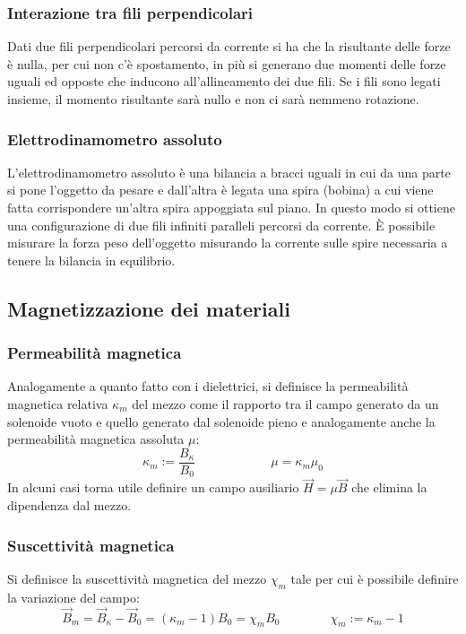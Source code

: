 \documentclass[a4paper]{article}
\begin{document}
\subsubsection*{Interazione tra fili perpendicolari}
Dati due fili perpendicolari percorsi da corrente si ha che la risultante delle forze è nulla, per cui non c'è spostamento,
in più si generano due momenti delle forze uguali ed opposte che inducono all'allineamento dei due fili. Se i fili sono legati
insieme, il momento risultante sarà nullo e non ci sarà nemmeno rotazione.

\subsubsection*{Elettrodinamometro assoluto}
L'elettrodinamometro assoluto è una bilancia a bracci uguali in cui da una parte si pone l'oggetto da pesare e dall'altra è
legata una spira (bobina) a cui viene fatta corrispondere un'altra spira appoggiata sul piano. In questo modo si ottiene una
configurazione di due fili infiniti paralleli percorsi da corrente. È possibile misurare la forza peso dell'oggetto misurando
la corrente sulle spire necessaria a tenere la bilancia in equilibrio.

\subsection{Magnetizzazione dei materiali}
\subsubsection*{Permeabilità magnetica}
Analogamente a quanto fatto con i dielettrici, si definisce la permeabilità magnetica relativa \(\kappa_m\) del mezzo come il
rapporto tra il campo generato da un solenoide vuoto e quello generato dal solenoide pieno e analogamente anche la permeabilità
magnetica assoluta \(\mu\): \[\kappa_m := \frac{B_\kappa}{B_0} \qquad\qquad\qquad \mu = \kappa_m \mu_0\]
In alcuni casi torna utile definire un campo ausiliario \(\vec{H} = \mu \vec{B}\) che elimina la dipendenza dal mezzo.

\subsubsection*{Suscettività magnetica}
Si definisce la suscettività magnetica del mezzo \(\chi_m\) tale per cui è possibile definire la variazione del campo:
\[\vec{B}_m = \vec{B}_\kappa - \vec{B}_0 = (\kappa_m - 1) B_0 = \chi_m B_0 \qquad\qquad \chi_m := \kappa_m - 1\]
\end{document}
